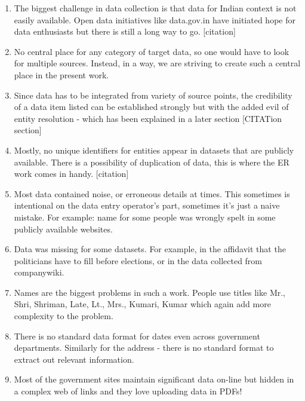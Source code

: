 \begin{enumerate}

    \item  The biggest challenge in data collection is that data for Indian context is not easily available.  Open data initiatives like data.gov.in have initiated hope for data enthusiasts but there is still a long way to go. [citation]

    \item No central place for any category of target data, so one would have to look for multiple sources. Instead, in a way, we are striving to create such a central place in the present work.

    \item Since data has to be integrated from variety of source points, the credibility of a data item listed can be established strongly but with the added evil of entity resolution - which has been explained in a later section [CITATion section]

    \item Mostly, no unique identifiers for entities appear in datasets that are publicly available. There is a possibility of duplication of data, this is where the ER work comes in handy. [citation] 

    \item Most data contained noise, or erroneous details at times. This sometimes is intentional on the data entry operator's part, sometimes it's just a naive mistake. For example: name for some people was wrongly spelt in some publicly available websites.

    \item Data was missing for some datasets. For example, in the affidavit that the politicians have to fill before elections, or in the data collected from companywiki.

    \item Names are the biggest problems in such a work. People use titles like Mr., Shri, Shriman, Late, Lt., Mrs., Kumari, Kumar which again add more complexity to the problem. 

    \item There is no standard data format for dates even across government departments. Similarly for the address - there is no standard format to extract out relevant information.

    \item Most of the government sites maintain significant data on-line but hidden in a complex web of links and they love uploading data in PDFs! 


\end{enumerate}


